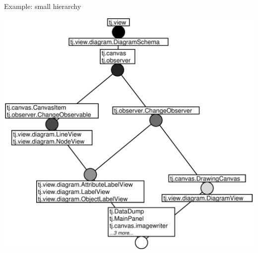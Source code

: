 \documentclass[pdf,prettybox]{prosper}
\begin{document}
\begin{slide}{Example: small hierarchy}
 \begin{center}
 \includegraphics[height = 0.8 \textheight]{img/derives-4.eps}
\end{center}
\end{slide}
\end{document}
